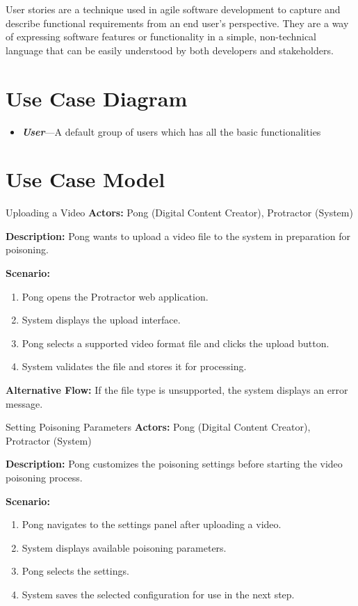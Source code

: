 User stories are a technique used in agile software
development to capture and describe functional requirements from an end
user's perspective. They are a way of expressing software features or
functionality in a simple, non-technical language that can be easily understood
by both developers and stakeholders.

\section{Use Case Diagram}
\label{section:use-case-diagram}

\begin{itemize}
    \item \textbf{\textit{User}}---A default group of users which has all the basic functionalities
\end{itemize}


\section{Use Case Model}
\label{section:use-case-model}

\begin{usecase}{Uploading a Video}
    \textbf{Actors:} Pong (Digital Content Creator), Protractor (System)

    \textbf{Description:} Pong wants to upload a video file to the system in preparation for poisoning.

    \textbf{Scenario:}
    \begin{enumerate}[leftmargin=80pt]
        \item Pong opens the Protractor web application.
        \item System displays the upload interface.
        \item Pong selects a supported video format file and clicks the upload button.
        \item System validates the file and stores it for processing.
    \end{enumerate}
    \textbf{Alternative Flow:} If the file type is unsupported, the system displays an error message.
\end{usecase}

\begin{usecase}{Setting Poisoning Parameters}
    \textbf{Actors:} Pong (Digital Content Creator), Protractor (System)

    \textbf{Description:} Pong customizes the poisoning settings before starting the video poisoning process.

    \textbf{Scenario:}
    \begin{enumerate}[leftmargin=80pt]
        \item Pong navigates to the settings panel after uploading a video.
        \item System displays available poisoning parameters.
        \item Pong selects the settings.
        \item System saves the selected configuration for use in the next step.
    \end{enumerate}
\end{usecase}

